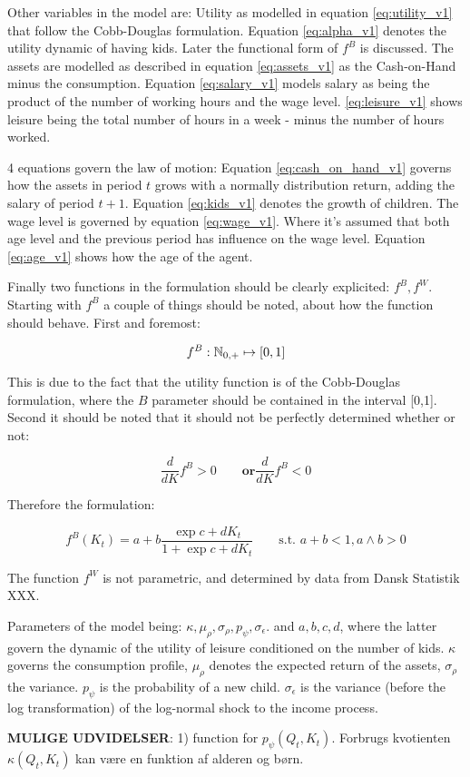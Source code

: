 Other variables in the model are: Utility as modelled in equation \eqref{eq:utility_v1} that follow the Cobb-Douglas formulation. Equation \eqref{eq:alpha_v1} denotes the utility dynamic of having kids. Later the functional form of $f^{B}$ is discussed. The assets are modelled as described in equation \eqref{eq:assets_v1} as the Cash-on-Hand minus the consumption. Equation \eqref{eq:salary_v1} models salary as being the product of the number of working hours and the wage level. \eqref{eq:leisure_v1} shows leisure being the total number of hours in a week - minus the number of hours worked.

4 equations govern the law of motion: Equation \eqref{eq:cash_on_hand_v1} governs how the assets in period $t$ grows with a normally distribution return, adding the salary of period $t+1$. Equation \eqref{eq:kids_v1} denotes the growth of children. The wage level is governed by equation \eqref{eq:wage_v1}. Where it's assumed that both age level and the previous period has influence on the wage level. Equation \eqref{eq:age_v1} shows how the age of the agent.

Finally two functions in the formulation should be clearly explicited: $f^{B}, f^{W}$. Starting with $f^{B}$ a couple of things should be noted, about how the function should behave. First and foremost:

\begin{equation}
    f^{B}: \mathbb{N}_{0,+} \mapsto [0,1]
\end{equation}

This is due to the fact that the utility function is of the Cobb-Douglas formulation, where the $B$ parameter should be contained in the interval [0,1]. Second it should be noted that it should not be perfectly determined whether or not:

\begin{equation}
    \frac{d}{d K}f^{B} > 0 \qquad \textbf{or} \frac{d}{d K}f^{B} < 0
\end{equation}

Therefore the formulation:

\begin{equation}
    f^{B} (K_t)= a + b \frac{\exp{c + d K_t}}{1 + \exp{c + d K_t}}\qquad  \text{s.t. } a + b < 1, a \land b > 0
\end{equation}

The function $f^{W}$ is not parametric, and determined by data from Dansk Statistik XXX.


Parameters of the model being: $\kappa, \mu_\rho, \sigma_\rho, p_\psi, \sigma_\epsilon$. and $a, b, c, d$, where the latter govern the dynamic of the utility of leisure conditioned on the number of kids. $\kappa$ governs the consumption profile, $\mu_\rho$ denotes the expected return of the assets, $\sigma_\rho$ the variance. $p_\psi$ is the probability of a new child. $\sigma_{\epsilon}$ is the variance (before the log transformation) of the log-normal shock to the income process.


\textbf{MULIGE UDVIDELSER}: 1) function for $p_\psi (Q_t, K_t)$.  Forbrugs kvotienten $\kappa (Q_t, K_t)$ kan være en funktion af alderen og børn.
